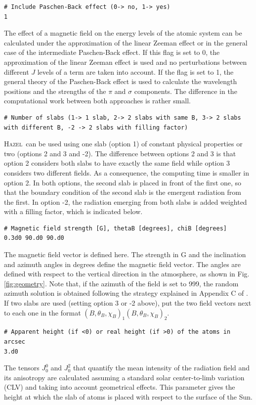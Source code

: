 \documentclass[12pt]{article}
\def\H{\textsc{Hazel}}
\begin{document}
\begin{verbatim}
# Include Paschen-Back effect (0-> no, 1-> yes)
1
\end{verbatim}
The effect of a magnetic field on the energy levels of the atomic system can be calculated
under the approximation of the linear Zeeman effect or in the general case of 
the intermediate Paschen-Back effect. If this flag is set to 0, the approximation of the linear Zeeman 
effect is used and no perturbations between different $J$ levels of a term are taken into
account. If the flag is set to 1, the general theory of the Paschen-Back effect is used to
calculate the wavelength positions and the strengths of the $\pi$ and $\sigma$ components. 
The difference in the computational work between both approaches is rather small.

\begin{verbatim}
# Number of slabs (1-> 1 slab, 2-> 2 slabs with same B, 3-> 2 slabs with different B, -2 -> 2 slabs with filling factor)
\end{verbatim}
\H\ can be used using one slab (option 1) of constant physical properties or two (options 2 and 3 and -2). The
difference between options 2 and 3 is that option 2 considers both slabs to have exactly the
same field while option 3 considers two different fields. As a consequence, the computing time
is smaller in option 2. In both options, the second slab is placed in front of the first one, so that
the boundary condition of the second slab is the emergent radiation from the first. In option -2, the
radiation emerging from both slabs is added weighted with a filling factor, which is indicated below.

\begin{verbatim}
# Magnetic field strength [G], thetaB [degrees], chiB [degrees]
0.3d0 90.d0 90.d0
\end{verbatim}
The magnetic field vector is defined here. The strength in G and the inclination and
azimuth angles in degrees define the magnetic field vector. The angles are defined with respect to the 
vertical direction in the atmosphere, as shown in Fig. \ref{fig:geometry}. Note that, if
the azimuth of the field is set to 999, the random azimuth solution is obtained following
the strategy explained in Appendix C of \cite{belluzzi07}.
If two slabs are used (setting option 3 or -2 above), put the two field vectors next to each one in the format $(B,\theta_B,\chi_B)_1 (B,\theta_B,\chi_B)_2$.

\begin{verbatim}
# Apparent height (if <0) or real height (if >0) of the atoms in arcsec
3.d0
\end{verbatim}
The tensors $J^0_0$ and $J^2_0$ that quantify the mean intensity of the radiation field and its anisotropy
are calculated assuming a standard solar center-to-limb variation (CLV) and taking into account 
geometrical effects. This parameter
gives the height at which the slab of atoms is placed with respect to the surface of the Sun.
\end{document}
